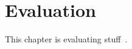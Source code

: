 \chapter{Evaluation}\label{sec:evaluation}

This chapter is evaluating stuff~\cite{Aboukhalil2008}.

\lipsum{}
